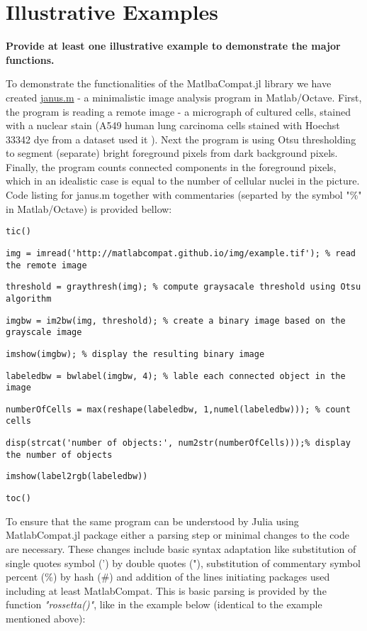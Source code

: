 \section{Illustrative Examples}
\label{} 

\textbf{Provide at least one illustrative example to demonstrate the major functions.}

To demonstrate the functionalities of the MatlbaCompat.jl library we have created \href{https://github.com/MatlabCompat/MatlabCompat.jl/blob/dev/test/janus.m}{janus.m} - a minimalistic image analysis program in Matlab/Octave. First, the program is reading a remote image - a micrograph of cultured cells, stained with a nuclear stain (A549 human lung carcinoma cells stained with Hoechst 33342 dye from a dataset used it \cite{22787215}). Next the program is using Otsu \cite{otsu1975threshold} thresholding to segment (separate) bright foreground pixels from dark background pixels. Finally, the program counts connected components in the foreground pixels, which in an idealistic case is equal to the number of cellular nuclei in the picture. Code listing for janus.m together with commentaries (separted by the symbol "\%" in Matlab/Octave) is provided bellow:

\verb|tic()|

\verb|img = imread('http://matlabcompat.github.io/img/example.tif'); % read the remote image|

\verb|threshold = graythresh(img); % compute graysacale threshold using Otsu algorithm|

\verb|imgbw = im2bw(img, threshold); % create a binary image based on the grayscale image|

\verb|imshow(imgbw); % display the resulting binary image|

\verb|labeledbw = bwlabel(imgbw, 4); % lable each connected object in the image|

\verb|numberOfCells = max(reshape(labeledbw, 1,numel(labeledbw))); % count cells|

\verb|disp(strcat('number of objects:', num2str(numberOfCells)));% display the number of objects|

\verb|imshow(label2rgb(labeledbw))|

\verb|toc()|

To ensure that the same program can be understood by Julia using MatlabCompat.jl package either a parsing step or minimal changes to the code are necessary. These changes include basic syntax adaptation like substitution of single quotes symbol (') by double quotes ("), substitution of commentary symbol percent (\%) by hash (#) and addition of the lines initiating packages used including at least MatlabCompat. This is basic parsing is provided by the function \textit{"rossetta()"}, like in the example below (identical to the example mentioned above):

